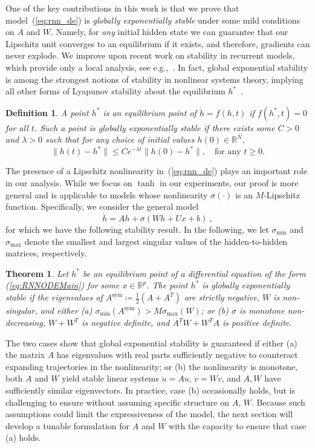 \documentclass{article} \usepackage{iclr2021_conference,times}
\newtheorem{theorem}{Theorem}
\newtheorem{definition}{Definition}
\newcommand{\sym}{\mathrm{sym}}
\begin{document}
One of the key contributions in this work is that we prove that model~(\ref{eq:rnn_de}) is \emph{globally exponentially stable} under some mild conditions on $A$ and $W$. Namely, for \emph{any} initial hidden state we can guarantee that our Lipschitz unit converges to an equilibrium if it exists, and therefore, gradients can never explode. We improve upon recent work on stability in recurrent models, which provide only a local analysis, see e.g.,~\citep{chang2018antisymmetricrnn}. In fact, global exponential stability is among the strongest notions of stability in nonlinear systems theory, implying all other forms of Lyapunov stability about the equilibrium $h^*$~\cite[Definitions 4.4 and 4.5]{khalil2002nonlinear}. 
\begin{definition}
A point $h^\ast$ is an \emph{equilibrium point} of $\dot{h} = f(h,t)$ if $f(h^\ast, t) = 0$ for all $t$. Such a point is \emph{globally exponentially stable} if there exists some $C > 0$ and $\lambda > 0$ such that for any choice of initial values $h(0) \in \mathbb{R}^N$,
\begin{equation}
\label{eq:ExpStable}
\|h(t) - h^\ast\| \leq C e^{-\lambda t} \|h(0) - h^\ast\|,\quad \mbox{for any }t \geq 0.
\end{equation}
\end{definition}
The presence of a Lipschitz nonlinearity in~(\ref{eq:rnn_de}) plays an important role in our analysis. While we focus on $\tanh$ in our experiments, our proof is more general and is applicable to models whose nonlinearity $\sigma(\cdot)$ is an $M$-Lipschitz function. Specifically, we consider the general model
\begin{equation}
\label{eq:RNNODEMain}
\dot{h} = Ah + \sigma(W h + U x + b) \ ,
\end{equation}
for which we have the following stability result. In the following, we let $\sigma_{\min}$ and $\sigma_{\max}$ denote the smallest and largest singular values of the hidden-to-hidden matrices, respectively.

\begin{theorem}
\label{thm:StabilityMain}
Let $h^\ast$ be an equilibrium point of a differential equation of the form (\ref{eq:RNNODEMain}) for some $x \in \mathbb{R}^p$. The point $h^\ast$ is globally exponentially stable if the eigenvalues of $A^{\sym} \coloneqq \frac12(A + A^T)$ are strictly negative, $W$ is non-singular, and either (a) $\sigma_{\min}(A^{\sym}) > M \sigma_{\max}(W)$; or (b)  $\sigma$ is monotone non-decreasing, $W + W^T$ is negative definite, and $A^T W + W^T A$ is positive definite.
\end{theorem}
The two cases show that global exponential stability is guaranteed if either (a) the matrix $A$ has eigenvalues with real parts sufficiently negative to counteract expanding trajectories in the nonlinearity; or (b) the nonlinearity is monotone, both $A$ and $W$ yield stable linear systems $\dot{u} = A u$, $\dot{v} = W v$, and $A,W$ have sufficiently similar eigenvectors. In practice, case (b) occasionally holds, but is challenging to ensure without assuming specific structure on $A$, $W$. Because such assumptions could limit the expressiveness of the model, the next section will develop a tunable formulation for $A$ and $W$ with the capacity to ensure that case (a) holds. 
\end{document}
